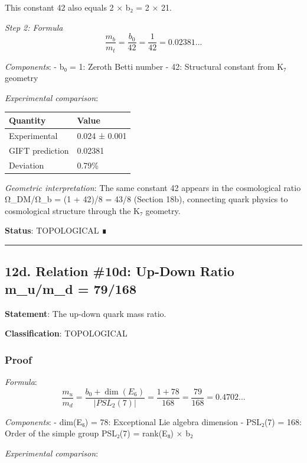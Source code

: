 \documentclass[11pt,a4paper]{article}
\begin{document}
This constant 42 also equals 2 × b₂ = 2 × 21.

\emph{Step 2: Formula}
\[\frac{m_b}{m_t} = \frac{b_0}{42} = \frac{1}{42} = 0.02381...\]

\emph{Components}:
- b₀ = 1: Zeroth Betti number
- 42: Structural constant from K₇ geometry

\emph{Experimental comparison}:

{\def\LTcaptype{none} %
\begin{longtable}[]{@{}ll@{}}
\toprule\noalign{}
Quantity & Value \\
\midrule\noalign{}
\endhead
\bottomrule\noalign{}
\endlastfoot
Experimental & 0.024 ± 0.001 \\
GIFT prediction & 0.02381 \\
Deviation & 0.79\% \\
\end{longtable}
}

\emph{Geometric interpretation}: The same constant 42 appears in the cosmological ratio Ω\_DM/Ω\_b = (1 + 42)/8 = 43/8 (Section 18b), connecting quark physics to cosmological structure through the K₇ geometry.

\textbf{Status}: TOPOLOGICAL ∎

\begin{center}\rule{0.5\linewidth}{0.5pt}\end{center}

\subsection{12d. Relation \#10d: Up-Down Ratio m\_u/m\_d = 79/168}\label{d.-relation-10d-up-down-ratio-m_um_d-79168}

\textbf{Statement}: The up-down quark mass ratio.

\textbf{Classification}: TOPOLOGICAL

\subsubsection{Proof}\label{proof-11}

\emph{Formula}:
\[\frac{m_u}{m_d} = \frac{b_0 + \dim(E_6)}{|PSL_2(7)|} = \frac{1 + 78}{168} = \frac{79}{168} = 0.4702...\]

\emph{Components}:
- dim(E₆) = 78: Exceptional Lie algebra dimension
- \textbar PSL₂(7)\textbar{} = 168: Order of the simple group PSL₂(7) = rank(E₈) × b₂

\emph{Experimental comparison}:
\end{document}

